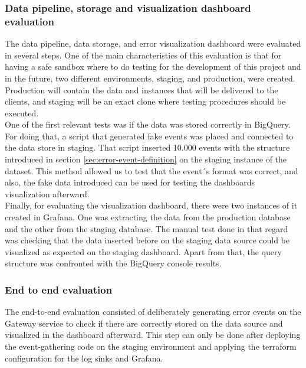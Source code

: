 \documentclass[english, 12pt, a4paper, sci, utf8, a-1b, online]{aaltothesis}
\begin{document}
\subsubsection{Data pipeline, storage and visualization dashboard evaluation}

The data pipeline, data storage, and error visualization dashboard were evaluated in several steps. One of the main characteristics of this evaluation is that for having a safe sandbox where to do testing for the development of this project and in the future, two different environments, staging, and production, were created. Production will contain the data and instances that will be delivered to the clients, and staging will be an exact clone where testing procedures should be executed.\\

One of the first relevant tests was if the data was stored correctly in BigQuery. For doing that, a script that generated fake events was placed and connected to the data store in staging. That script inserted 10.000 events with the structure introduced in section \ref{sec:error-event-definition} on the staging instance of the dataset. This method allowed us to test that the event´s format was correct, and also, the fake data introduced can be used for testing the dashboards visualization afterward.\\

Finally, for evaluating the visualization dashboard, there were two instances of it created in Grafana. One was extracting the data from the production database and the other from the staging database. The manual test done in that regard was checking that the data inserted before on the staging data source could be visualized as expected on the staging dashboard. Apart from that, the query structure was confronted with the BigQuery console results.

\subsubsection{End to end evaluation}
\label{sec:e2e-eval}

The end-to-end evaluation consisted of deliberately generating error events on the Gateway service to check if there are correctly stored on the data source and visualized in the dashboard afterward. This step can only be done after deploying the event-gathering code on the staging environment and applying the terraform configuration for the log sinks and Grafana.\\
\end{document}
